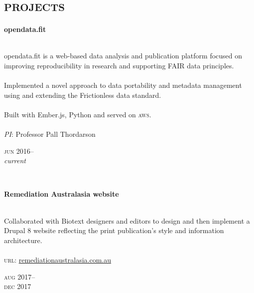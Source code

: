 
\vspace{-0.6cm}
\section*{\textsc{projects}}
\vspace{-0.2cm}

\begin{minipage}[t]{\mainboxwidth\textwidth}
\textbf{opendata.fit}\\
{\small
\\
opendata.fit is a web-based data analysis and publication platform focused on improving reproducibility in research and supporting FAIR data principles.\\
\\
Implemented a novel approach to data portability and metadata management using and extending the Frictionless data standard.\\
\\
Built with Ember.js, Python and served on \textsc{aws}.\\
\\
\textit{PI}: Professor Pall Thordarson\\
\par}
\end{minipage}
\begin{minipage}[t]{\detailboxwidth\textwidth}
{
\hfill \textsc{jun} 2016--\\ 
\hspace*{0pt} \hfill \textit{\small current}
\par
}
\end{minipage}
\\


\begin{minipage}[t]{\mainboxwidth\textwidth}
\textbf{Remediation Australasia website}\\
{\small
\\
Collaborated with Biotext designers and editors to design and then implement a Drupal 8 website reflecting
the print publication's style and information architecture. \\
\\
\textsc{url}: \href{https://www.remediationaustralasia.com.au/}{remediationaustralasia.com.au} 
\par
}
\end{minipage}
\begin{minipage}[t]{\detailboxwidth\textwidth}
{
\hfill \textsc{aug} 2017--\\ 
\hspace*{0pt} \hfill \textsc{dec} 2017
\par
}
\end{minipage}
\\

